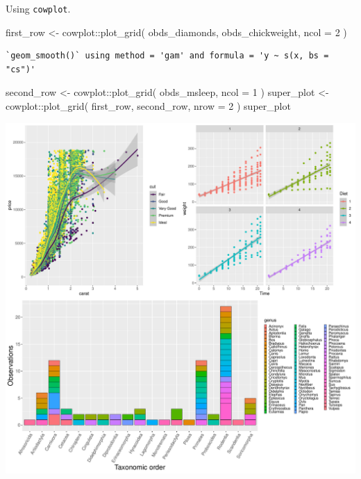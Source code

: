 \documentclass[
  letterpaper,
  DIV=11,
  numbers=noendperiod]{scrartcl}
\newenvironment{Shaded}{\begin{snugshade}}{\end{snugshade}}
\newcommand{\AttributeTok}[1]{\textcolor[rgb]{0.40,0.45,0.13}{#1}}
\newcommand{\DecValTok}[1]{\textcolor[rgb]{0.68,0.00,0.00}{#1}}
\newcommand{\FunctionTok}[1]{\textcolor[rgb]{0.28,0.35,0.67}{#1}}
\newcommand{\NormalTok}[1]{\textcolor[rgb]{0.00,0.23,0.31}{#1}}
\newcommand{\OtherTok}[1]{\textcolor[rgb]{0.00,0.23,0.31}{#1}}
\newcommand{\SpecialCharTok}[1]{\textcolor[rgb]{0.37,0.37,0.37}{#1}}
\begin{document}
Using \texttt{cowplot}.

\begin{Shaded}
\begin{Highlighting}[]
\NormalTok{first\_row }\OtherTok{\textless{}{-}}\NormalTok{ cowplot}\SpecialCharTok{::}\FunctionTok{plot\_grid}\NormalTok{(}
\NormalTok{  obds\_diamonds, obds\_chickweight,}
  \AttributeTok{ncol =} \DecValTok{2}
\NormalTok{)}
\end{Highlighting}
\end{Shaded}

\begin{verbatim}
`geom_smooth()` using method = 'gam' and formula = 'y ~ s(x, bs = "cs")'
\end{verbatim}

\begin{Shaded}
\begin{Highlighting}[]
\NormalTok{second\_row }\OtherTok{\textless{}{-}}\NormalTok{ cowplot}\SpecialCharTok{::}\FunctionTok{plot\_grid}\NormalTok{(}
\NormalTok{  obds\_msleep, }\AttributeTok{ncol =} \DecValTok{1}
\NormalTok{)}
\NormalTok{super\_plot }\OtherTok{\textless{}{-}}\NormalTok{ cowplot}\SpecialCharTok{::}\FunctionTok{plot\_grid}\NormalTok{(}
\NormalTok{  first\_row, second\_row,}
  \AttributeTok{nrow =} \DecValTok{2}
\NormalTok{)}
\NormalTok{super\_plot}
\end{Highlighting}
\end{Shaded}

\includegraphics{5-ggplot2_kevin_files/figure-pdf/unnamed-chunk-25-1.pdf}
\end{document}
